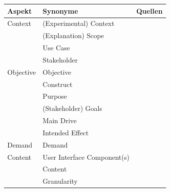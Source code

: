 \begin{table}
        \begin{tabular}{|p{}|p{}|p{}|}
            \hline
            \textbf{Aspekt}          & \textbf{Synonyme} & \textbf{Quellen} \\ \hline
            Context         & (Experimental) Context & \cite{chazette_knowledge_nodate} \cite{chazette_end-users_nodate} \cite{sato_context_nodate} \cite{waa_evaluating_2021} \cite{kohl_explainability_2019} \cite{neerincx_using_2018} \cite{sovrano_modelling_2020} \cite{doshi2017towards} \\
                            & (Explanation) Scope & \cite{wohlin2012experimentation} \cite{eiband_impact_2019} \cite{doshi2017towards} \\
                            & Use Case & \cite{waa_evaluating_2021} \\
                            & Stakeholder & \cite{rosenfeld_explainability_2019} \\
            \hline
            Objective       & Objective & \cite{nunes_systematic_2017} \\
                            & Construct & \cite{waa_evaluating_2021} \\
                            & Purpose & \cite{nunes_systematic_2017} \cite{wohlin2012experimentation} \\
                            & (Stakeholder) Goals & \cite{cirqueira_scenario-based_2020} \cite{sovrano_modelling_2020} \cite{ribera2019can} \\
                            & Main Drive & \cite{anjomshoae2019explainable} \\
                            & Intended Effect & \cite{balog_measuring_2020} \\
            \hline
            Demand          & Demand            & \cite{chazette_knowledge_nodate} \\
            \hline
            Content         & User Interface Component(s) & \cite{nunes_systematic_2017}
                                                            \cite{rosenfeld_explainability_2019} \\
                            & Content               & \cite{ribera2019can} \\
                            & Granularity           & \cite{chazette_knowledge_nodate}
                                                      \cite{kohl_explainability_2019} \\
            \hline

\end{tabular}
\end{table}
